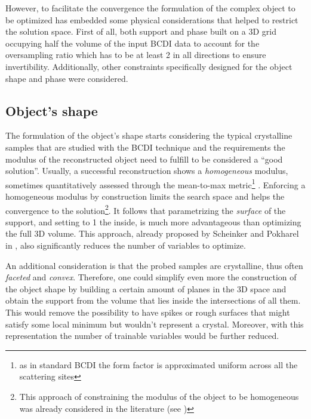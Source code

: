 However, to facilitate the convergence the formulation of the complex object to be optimized has embedded some physical considerations that 
helped to restrict the solution space. First of all, both support and phase built on a 3D grid occupying half the volume of the 
input BCDI data to account for the oversampling ratio which has to be at least 2 in all directions to ensure invertibility.  
Additionally, other constraints specifically designed for the object shape and phase were considered. 

\subsection{Object's shape}

The formulation of the object's shape starts considering the typical crystalline samples that are studied with the BCDI technique
and the requirements the modulus of the reconstructed object need to fulfill to be considered a ``good solution''. 
Usually, a successful reconstruction shows a \textit{homogeneous} modulus, sometimes quantitatively assessed through the 
mean-to-max metric\footnote[1]{as in standard BCDI the form factor is 
approximated uniform across all the scattering sites} \cite{Frisch2023CuAgCatalysts, Grimes2024CatalystStrain}. Enforcing a homogeneous modulus by construction limits the search space 
and helps the convergence to the solution\footnote[2]{This approach of constraining the modulus of the object to be homogeneous was already 
considered in the literature (see \cite{Minkevich2007_virginie, Minkevich2008_baumbach, Madsen2021})}.
It follows that parametrizing the \textit{surface} of the support, and setting to 1 the inside, is much more advantageous than optimizing 
the full 3D volume. This approach, already proposed by Scheinker and Pokharel in \cite{scheinker_adaptive_2020}, 
also significantly reduces the number of variables to optimize.

An additional consideration is that the probed samples are crystalline, thus often \textit{faceted} and \textit{convex}. 
Therefore, one could simplify even more the construction of the object shape by building a certain amount of planes in the 
3D space and obtain the support from the volume that lies inside the intersections of all them. This would remove the possibility 
to have spikes or rough surfaces that might satisfy some local minimum but wouldn't represent a crystal. Moreover, with this 
representation the number of trainable variables would be further reduced. 


